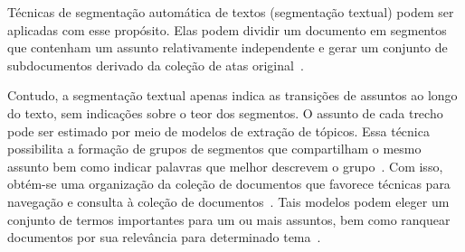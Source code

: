


Técnicas de segmentação automática de textos (segmentação textual) podem ser aplicadas com esse propósito. Elas podem dividir um documento em segmentos que contenham um assunto relativamente independente e gerar um conjunto de subdocumentos derivado da coleção de atas original~\cite{Aggarwal2018, bokaei2015a, sakahara2014a, misra2009a, Eis2008, choi2000a}.






Contudo, a segmentação textual apenas indica as transições de assuntos ao longo do texto,  sem indicações sobre o teor dos segmentos. O assunto de cada trecho pode ser estimado por meio de modelos de extração de tópicos. Essa técnica possibilita a formação de grupos de segmentos que compartilham o mesmo assunto bem como indicar palavras que melhor descrevem o grupo~\cite{Wei2007}. Com isso, obtém-se uma organização da coleção de documentos que favorece técnicas para navegação e consulta à coleção de documentos~\cite{Maracini2010}. Tais modelos podem eleger um conjunto de termos importantes para um ou mais assuntos, bem como ranquear documentos por sua relevância para determinado tema~\cite{Faleiros2016,Xing2009}.








